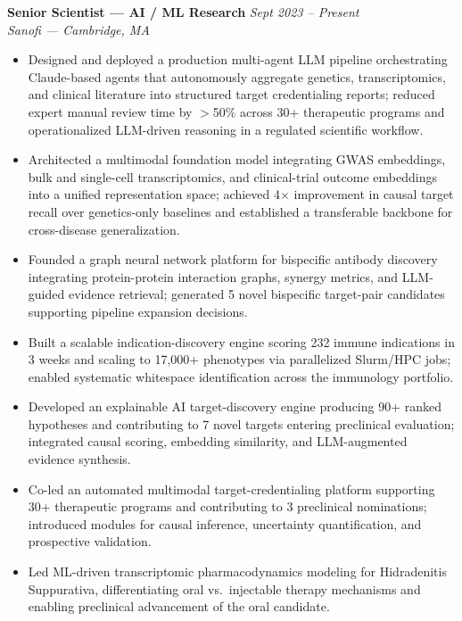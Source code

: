 \documentclass[11pt,letterpaper]{article}
\newcommand{\role}[4]{%
  \noindent\textbf{#1} \hfill \textit{#3}\\[1pt]
  \textit{#2} \hfill \textit{#4}\par\vspace{2pt}}
\begin{document}
\role{Senior Scientist --- AI / ML Research}{Sanofi --- Cambridge, MA}{Sept 2023 -- Present}{}
\begin{itemize}
  \item Designed and deployed a production multi-agent LLM pipeline orchestrating Claude-based agents
        that autonomously aggregate genetics, transcriptomics, and clinical literature into structured
        target credentialing reports; reduced expert manual review time by $>$50\% across 30+ therapeutic
        programs and operationalized LLM-driven reasoning in a regulated scientific workflow.
  \item Architected a multimodal foundation model integrating GWAS embeddings, bulk and single-cell
        transcriptomics, and clinical-trial outcome embeddings into a unified representation space;
        achieved 4$\times$ improvement in causal target recall over genetics-only baselines and established
        a transferable backbone for cross-disease generalization.
  \item Founded a graph neural network platform for bispecific antibody discovery integrating
        protein-protein interaction graphs, synergy metrics, and LLM-guided evidence retrieval;
        generated 5 novel bispecific target-pair candidates supporting pipeline expansion decisions.
  \item Built a scalable indication-discovery engine scoring 232 immune indications in 3 weeks and
        scaling to 17,000+ phenotypes via parallelized Slurm/HPC jobs; enabled systematic whitespace
        identification across the immunology portfolio.
  \item Developed an explainable AI target-discovery engine producing 90+ ranked hypotheses and
        contributing to 7 novel targets entering preclinical evaluation; integrated causal scoring,
        embedding similarity, and LLM-augmented evidence synthesis.
  \item Co-led an automated multimodal target-credentialing platform supporting 30+ therapeutic
        programs and contributing to 3 preclinical nominations; introduced modules for causal inference,
        uncertainty quantification, and prospective validation.
  \item Led ML-driven transcriptomic pharmacodynamics modeling for Hidradenitis Suppurativa,
        differentiating oral vs.\ injectable therapy mechanisms and enabling preclinical advancement
        of the oral candidate.
\end{itemize}
\end{document}
